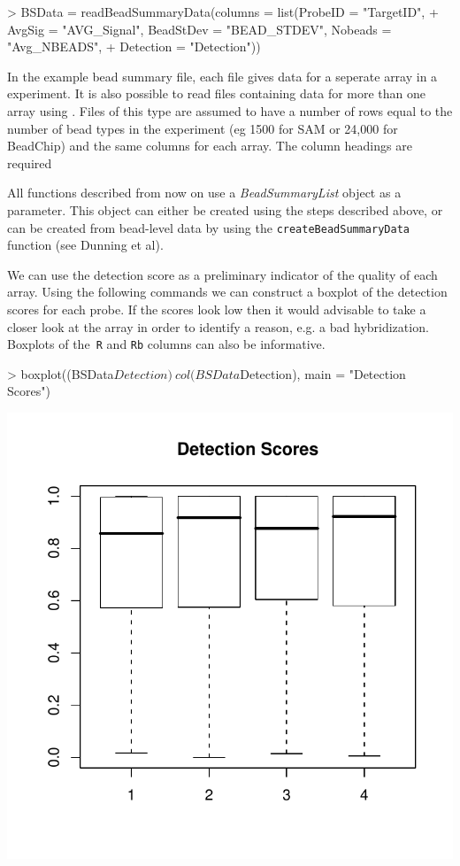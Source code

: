 \documentclass[a4paper]{article}
\newcommand{\Robject}[1]{{\texttt{#1}}}
\newcommand{\Rfunction}[1]{{\texttt{#1}}}
\newcommand{\Rclass}[1]{{\textit{#1}}}
\begin{document}
\begin{Schunk}
\begin{Sinput}
> BSData = readBeadSummaryData(columns = list(ProbeID = "TargetID", 
+     AvgSig = "AVG_Signal", BeadStDev = "BEAD_STDEV", Nobeads = "Avg_NBEADS", 
+     Detection = "Detection"))
\end{Sinput}
\end{Schunk}

In the example bead summary file, each file gives data for a seperate
array in a experiment. It is also possible to read files containing
data for more than one array using . Files
of this type are assumed to have a number of rows equal to the number
of bead types in the experiment (eg 1500 for SAM or 24,000 for
BeadChip) and the same columns for each array. The column headings are required


All functions described from now on use a \Rclass{BeadSummaryList} object as a parameter. This object can either be created using the steps described above, or can be created from bead-level data by using 
the \Rfunction{createBeadSummaryData} function (see Dunning et al).

We can use the detection score as a preliminary indicator of the quality of each array.  Using the following commands we can construct a boxplot of the detection scores for each probe.  If the scores look low then it would advisable to take a closer look at the array in order to identify a reason, e.g. a bad hybridization. Boxplots of the\Robject{ R} and \Robject{Rb} columns can also be informative.

\begin{center}
\begin{Schunk}
\begin{Sinput}
> boxplot((BSData$Detection) ~ col(BSData$Detection), main = "Detection Scores")
\end{Sinput}
\end{Schunk}
\includegraphics{bead-vignette-31}
\end{center}
\end{document}
